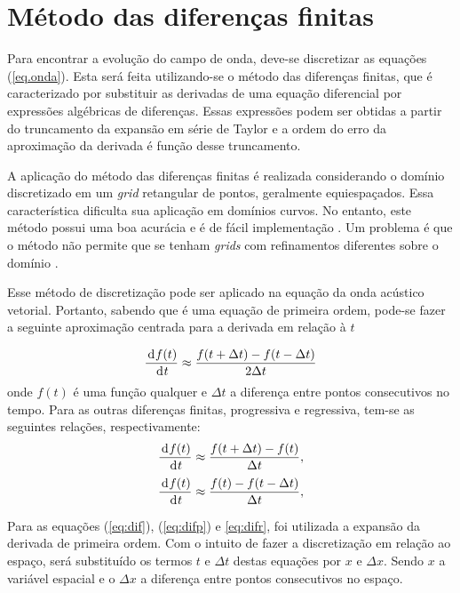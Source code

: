 \section{M\'etodo das diferenças finitas}


Para encontrar a evolução do campo de onda, deve-se discretizar as equa\c{c}\~oes 
(\ref{eq.onda}). Esta será feita utilizando-se o método das diferenças 
finitas, que é caracterizado por substituir as derivadas de uma equação 
diferencial por expressões algébricas de diferenças. Essas expressões podem ser 
obtidas a partir do truncamento da expansão em série de Taylor e a ordem do erro 
da aproximação da derivada é função desse truncamento. 

A aplicação do método das diferenças finitas é realizada considerando o 
domínio discretizado em um \textit{grid} retangular de pontos, geralmente 
equiespaçados. Essa característica dificulta sua aplicação em domínios curvos. 
No entanto, este método possui uma boa acurácia e é de fácil implementação 
\citep{snieder1998}. Um problema é 
que o método não permite que se tenham \textit{grids} com refinamentos 
diferentes sobre o domínio \citep{zakaria2000two}. 


Esse método de discretização pode ser aplicado na 
equação da onda acústico vetorial.  Portanto, sabendo que é 
uma equação de primeira ordem, pode-se fazer a seguinte aproximaç\~ao centrada  para a 
derivada em rela\c{c}\~ao \`a $t$


\begin{equation}
\DDt[f(t)] \approx \frac{f(t+\Delta t)-f(t-\Delta t)}{2\Delta t} \label{eq:dif}
\end{equation} 
onde $f(t)$ é uma função qualquer e $\Delta t$ a diferença entre pontos consecutivos no tempo.
Para as outras diferenças finitas, progressiva e regressiva, tem-se as seguintes relações, respectivamente:
\begin{equation}
\DDt[f(t)] \approx \frac{f(t+\Delta t)-f(t)}{\Delta t} \label{eq:difp},
\end{equation}
\begin{equation}
\DDt[f(t)] \approx \frac{f(t)-f(t-\Delta t)}{\Delta t} \label{eq:difr},
\end{equation}

Para as equações (\ref{eq:dif}), (\ref{eq:difp}) e \ref{eq:difr}, foi utilizada a expansão da derivada de primeira ordem. Com o intuito de fazer a discretização em relação ao espaço, será substituído os termos $t$ e $\Delta t$ destas equações por $x$
e $\Delta x$. Sendo $x$ a variável espacial e o $\Delta x$ a diferença entre pontos consecutivos no espaço. 
